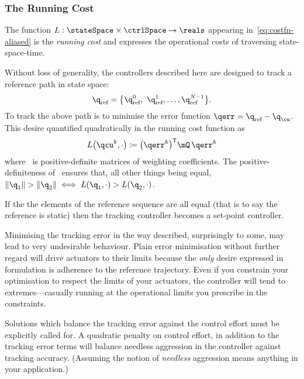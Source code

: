 \subsubsection{The Running Cost}%


The function $L:\stateSpace\times\ctrlSpace\rightarrow\reals$ appearing
in~\eqref{eq:costfn-aliased} is the \emph{running cost} and
expresses the operational costs of traversing state-space-time.

Without loss of generality, the controllers described here are designed to track
a reference path in state space:
%
\begin{equation*}
  \q\rnc=\bigl\{\q\rnc^0,\ \q\rnc^1,\ldots,\q\rnc^{N-1}\bigr\}.
\end{equation*}
%
To track the above path is to minimise the error function $\qerr = \q\rnc -
\q_\cu$. This desire quantified quadratically in the
running cost function as
%
\begin{equation}\label{L-err}
  L\bigl(\qcu^k,\cdot\bigr) \coloneq \bigl(\qerr^k\bigr)\tr\mQ\,\qerr^k
\end{equation}
%
where \mQ\ is positive-definite matrices of weighting coefficients. The
positive-definiteness of \mQ\ ensures that, all other things being equal,
$\norm{\q_1} > \norm{\q_2} \iff L(\q_1,\cdot) > L(\q_2,\cdot)$.

If the the elements of the reference sequence are all equal (that is to say the
reference is static) then the tracking controller becomes a set-point
controller.

Minimising the tracking error in the way described, surprisingly to some, may
lead to very undesirable behaviour. Plain error minimisation without further
regard will drive actuators to their limits because the \emph{only} desire
expressed in formulation is adherence to the reference trajectory. Even if you
constrain your optimisation to respect the limits of your actuators, the
controller will tend to extremes—casually running at the operational limits you
prescribe in the constraints.

Solutions which balance the tracking error against the control effort must be
explicitly called for. A quadratic penalty on
control effort, in addition to the tracking error terms will balance needless
aggression in the controller against tracking accuracy. (Assuming the notion of
\emph{needless} aggression means anything in your application.)

